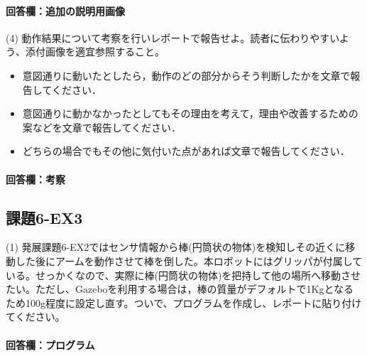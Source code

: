 \documentclass[12pt, xelatex,ja=standard,jafont=noto]{bxjsarticle}
\newif\ifdraft
\begin{document}
\paragraph{回答欄：追加の説明用画像}
\ifdraft
説明に必要な追加画像があれば貼り付ける
\fi

\begin{itembox}[l]{(4)}
動作結果について考察を行いレポートで報告せよ。読者に伝わりやすいよう、添付画像を適宜参照すること。
\begin{itemize}
    \item 意図通りに動いたとしたら，動作のどの部分からそう判断したかを文章で報告してください．
    \item 意図通りに動かなかったとしてもその理由を考えて，理由や改善するための案などを文章で報告してください．
    \item どちらの場合でもその他に気付いた点があれば文章で報告してください．
\end{itemize}
\end{itembox}

\paragraph{回答欄：考察}
\ifdraft
詳しい考察を記載する。
\fi

\subsection{課題6-EX3}
\begin{itembox}[l]{(1)}
発展課題6-EX2ではセンサ情報から棒(円筒状の物体)を検知しその近くに移動した後にアームを動作させて棒を倒した。本ロボットにはグリッパが付属している。せっかくなので、実際に棒(円筒状の物体)を把持して他の場所へ移動させたい。ただし、Gazeboを利用する場合は，棒の質量がデフォルトで1Kgとなるため100g程度に設定し直す。ついで、プログラムを作成し、レポートに貼り付けてください。
\end{itembox}

\paragraph{回答欄：プログラム}
\ifdraft
センサ情報から円筒状の物体を検知しその近くに移動し、その物体を倒すプログラムをリスト\ref{lst:movetocylinder2}に示す…
\begin{lstlisting}[caption=コード,label=lst:movetocylinder2]
...
\end{lstlisting}
\fi
\end{document}
